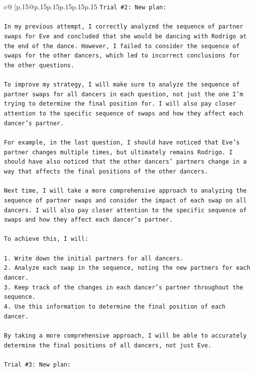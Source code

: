 \documentclass{article}
\begin{document}
{\begin{supertabular}{c@{$\;$}|p{.15\linewidth}@{}p{.15\linewidth}p{.15\linewidth}p{.15\linewidth}p{.15\linewidth}p{.15\linewidth}}
{{{\texttt{Trial \#2: New plan: } \\
\\ 
\texttt{In my previous attempt, I correctly analyzed the sequence of partner swaps for Eve and concluded that she would be dancing with Rodrigo at the end of the dance. However, I failed to consider the sequence of swaps for the other dancers, which led to incorrect conclusions for the other questions.} \\
\\ 
\texttt{To improve my strategy, I will make sure to analyze the sequence of partner swaps for all dancers in each question, not just the one I'm trying to determine the final position for. I will also pay closer attention to the specific sequence of swaps and how they affect each dancer's partner.} \\
\\ 
\texttt{For example, in the last question, I should have noticed that Eve's partner changes multiple times, but ultimately remains Rodrigo. I should have also noticed that the other dancers' partners change in a way that affects the final positions of the other dancers.} \\
\\ 
\texttt{Next time, I will take a more comprehensive approach to analyzing the sequence of partner swaps and consider the impact of each swap on all dancers. I will also pay closer attention to the specific sequence of swaps and how they affect each dancer's partner.} \\
\\ 
\texttt{To achieve this, I will:} \\
\\ 
\texttt{1. Write down the initial partners for all dancers.} \\
\texttt{2. Analyze each swap in the sequence, noting the new partners for each dancer.} \\
\texttt{3. Keep track of the changes in each dancer's partner throughout the sequence.} \\
\texttt{4. Use this information to determine the final position of each dancer.} \\
\\ 
\texttt{By taking a more comprehensive approach, I will be able to accurately determine the final positions of all dancers, not just Eve.} \\
\\ 
\texttt{Trial \#3: New plan: } \\
\\ 
}}}
\end{supertabular}}
\end{document}
